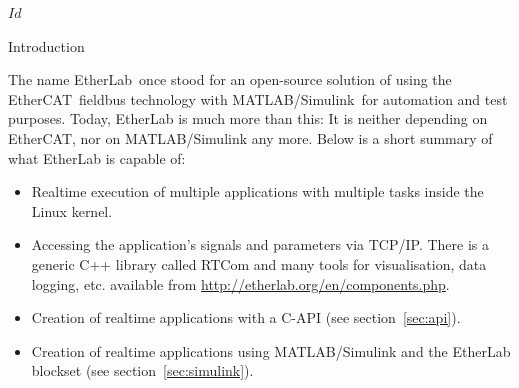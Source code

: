%
%
%

\SVN $Id$
\rfoot{\SVNId}

\begin{ighsec}{Introduction}
\label{sec:intro}

The name EtherLab\regTM\ once stood for an open-source solution of using the
EtherCAT\regTM\ fieldbus technology with MATLAB/Simulink\regTM\ for automation
and test purposes. Today, EtherLab is much more than this: It is neither
depending on EtherCAT, nor on MATLAB/Simulink any more. Below is a short
summary of what EtherLab is capable of:

\begin{itemize}

\item Realtime execution of multiple applications with multiple tasks inside
the Linux kernel.

\item Accessing the application's signals and parameters via TCP/IP. There is
a generic C++ library called RTCom and many tools for visualisation, data
logging, etc. available from \url{http://etherlab.org/en/components.php}.

\item Creation of realtime applications with a C-API (see
section~\ref{sec:api}).

\item Creation of realtime applications using MATLAB/Simulink and the EtherLab
blockset (see section~\ref{sec:simulink}).

\end{itemize}

\end{ighsec}


